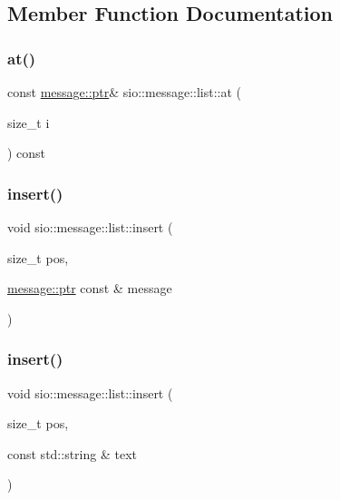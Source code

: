\subsection{Member Function Documentation}
\mbox{\label{classsio_1_1message_1_1list_acf5d210bfc1b787cbd2cf6ca0abd4fb4}} 
\subsubsection{\texorpdfstring{at()}{at()}}
{\footnotesize\ttfamily const \hyperlink{classsio_1_1message_a6340b6fef57e4516eb17928b1885a615}{message\+::ptr}\& sio\+::message\+::list\+::at (\begin{DoxyParamCaption}\item[{size\+\_\+t}]{i }\end{DoxyParamCaption}) const\hspace{0.3cm}{\ttfamily [inline]}}

\mbox{\label{classsio_1_1message_1_1list_afa415670851855923f74ccb8837267d9}} 
\subsubsection{\texorpdfstring{insert()}{insert()}\hspace{0.1cm}{\footnotesize\ttfamily [1/5]}}
{\footnotesize\ttfamily void sio\+::message\+::list\+::insert (\begin{DoxyParamCaption}\item[{size\+\_\+t}]{pos,  }\item[{\hyperlink{classsio_1_1message_a6340b6fef57e4516eb17928b1885a615}{message\+::ptr} const \&}]{message }\end{DoxyParamCaption})\hspace{0.3cm}{\ttfamily [inline]}}

\mbox{\label{classsio_1_1message_1_1list_a4fd814b68e176d8098801db1de7a1cf1}} 
\subsubsection{\texorpdfstring{insert()}{insert()}\hspace{0.1cm}{\footnotesize\ttfamily [2/5]}}
{\footnotesize\ttfamily void sio\+::message\+::list\+::insert (\begin{DoxyParamCaption}\item[{size\+\_\+t}]{pos,  }\item[{const std\+::string \&}]{text }\end{DoxyParamCaption})\hspace{0.3cm}{\ttfamily [inline]}}

